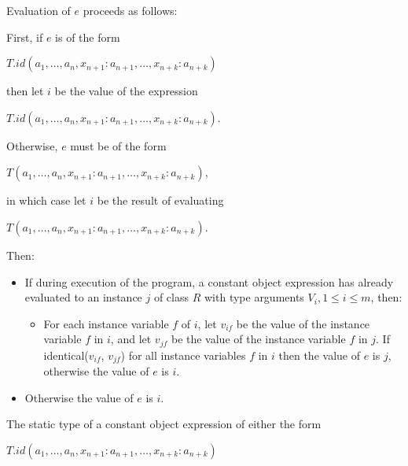 \documentclass{article}
\newcommand{\code}[1]{{\sf #1}}
\begin{document}
\LMHash{}
Evaluation of $e$ proceeds as follows:

\LMHash{}
First, if $e$ is of the form

\CONST{} $T.id(a_1, \ldots , a_n, x_{n+1}: a_{n+1}, \ldots , x_{n+k}: a_{n+k})$

then let $i$ be the value of the expression

\NEW{} $T.id(a_1, \ldots , a_n, x_{n+1}: a_{n+1}, \ldots , x_{n+k}: a_{n+k})$.

\LMHash{}
Otherwise, $e$ must be of the form

\CONST{} $T(a_1, \ldots , a_n, x_{n+1}: a_{n+1}, \ldots , x_{n+k}: a_{n+k})$,

in which case let $i$ be the result of evaluating

\NEW{} $T(a_1, \ldots , a_n, x_{n+1}: a_{n+1}, \ldots , x_{n+k}: a_{n+k})$.

\LMHash{}
Then:
\begin{itemize}
\item If during execution of the program, a constant object expression has already evaluated to an instance $j$ of class $R$ with type arguments $V_i, 1 \le i \le m$, then:
\begin{itemize}
\item For each instance variable $f$ of $i$, let $v_{if}$ be the value of the instance variable $f$ in $i$, and let $v_{jf}$ be the value of the instance variable $f$ in $j$.
  If \code{identical($v_{if}$, $v_{jf}$)} for all instance variables $f$ in $i$ then the value of $e$ is $j$, otherwise the value of $e$ is $i$.
\end{itemize}
\item Otherwise the value of $e$ is $i$.
\end{itemize}


\LMHash{}
The static type of a constant object expression of either the form

\CONST{} $T.id(a_1, \ldots , a_n, x_{n+1}: a_{n+1}, \ldots , x_{n+k}: a_{n+k})$
\end{document}
